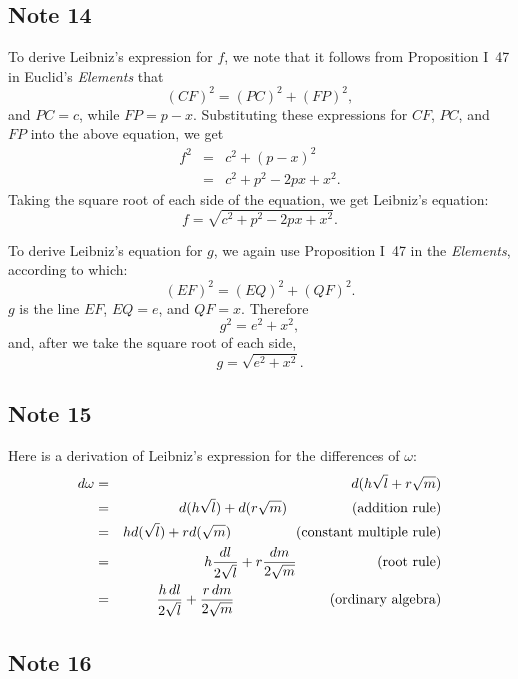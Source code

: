 \documentclass[twoside,openright]{article}
\begin{document}
\subsection*{Note 14}
\label{cnm14}

To derive Leibniz's expression for $f$, we note that it follows from
Proposition I~47 in Euclid's {\em Elements} that
$$(CF)^2 =  (PC)^2 + (FP)^2 ,$$
and $PC= c$, while $FP = p-x$.  Substituting these expressions for
$CF$, $PC$, and $FP$ into the above equation, we get
\begin{eqnarray*}
f^2  & = & c^2 + (p-x)^2 \\
& = &  c^2 + p^2 - 2px + x^2.
\end{eqnarray*}
Taking the square root of each side of the equation, we get Leibniz's equation:
$$f = \sqrt{c^2 + p^2 - 2px + x^2}.$$

To derive Leibniz's equation for $g$, we again use Proposition I~47 in the {\em Elements}, according to which:
$$(EF)^2 = (EQ)^2 + (QF)^2.$$
$g$ is the line $EF$, $EQ = e$, and $QF = x$.  Therefore
$$g^2 = e^2 + x^2,$$
and, after we take the square root of each side,
$$g = \sqrt{e^2 + x^2}.$$

\subsection*{Note 15}
\label{cnm15}

Here is a derivation of Leibniz's expression for the differences of $\omega$:
\begin{eqnarray*}
d\omega & = & d(h\sqrt{l} + r\sqrt{m})\\
& = & d(h\sqrt{l}) + d(r\sqrt{m}) \mbox{\hspace{10ex} (addition rule)}\\
& = & hd(\sqrt{l}) + rd(\sqrt{m})  \mbox{\hspace{10ex} (constant multiple rule)}\\
& = & h\frac{dl}{2\sqrt{l}} + r\frac{dm}{2\sqrt{m}}  \mbox{\hspace{12.6ex} (root rule)}\\
& = & \frac{h\,dl}{2\sqrt{l}} + \frac{r\,dm}{2\sqrt{m}} \mbox{\hspace{15.1ex} (ordinary algebra)}
\end{eqnarray*}

\subsection*{Note 16}
\label{cnm16}
\end{document}
